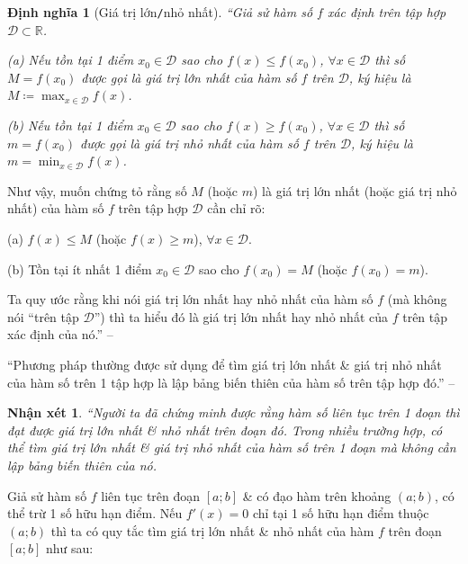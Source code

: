 \documentclass{article}
\numberwithin{equation}{section}
\newtheorem{nhanxet}{Nhận xét}[section]
\newtheorem{dinhnghia}{Định nghĩa}[section]
\begin{document}
\begin{dinhnghia}[Giá trị lớn\texttt{/}nhỏ nhất]
	``Giả sử hàm số $f$ xác định trên tập hợp $\mathcal{D}\subset\mathbb{R}$.
	\begin{enumerate*}
		\item[(a)] Nếu tồn tại 1 điểm $x_0\in\mathcal{D}$ sao cho $f(x)\le f(x_0)$, $\forall x\in\mathcal{D}$ thì số $M = f(x_0)$ được gọi là \emph{giá trị lớn nhất} của hàm số $f$ trên $\mathcal{D}$, ký hiệu là $M\coloneqq\max_{x\in\mathcal{D}} f(x)$.
		\item[(b)] Nếu tồn tại 1 điểm $x_0\in\mathcal{D}$ sao cho $f(x)\ge f(x_0)$, $\forall x\in\mathcal{D}$ thì số $m = f(x_0)$ được gọi là \emph{giá trị nhỏ nhất} của hàm số $f$ trên $\mathcal{D}$, ký hiệu là $m = \min_{x\in\mathcal{D}} f(x)$.
	\end{enumerate*}
\end{dinhnghia}
Như vậy, muốn chứng tỏ rằng số $M$ (hoặc $m$) là giá trị lớn nhất (hoặc giá trị nhỏ nhất) của hàm số $f$ trên tập hợp $\mathcal{D}$ cần chỉ rõ:
\begin{enumerate*}
	\item[(a)] $f(x)\le M$ (hoặc $f(x)\ge m$), $\forall x\in\mathcal{D}$.
	\item[(b)] Tồn tại ít nhất 1 điểm $x_0\in\mathcal{D}$ sao cho $f(x_0) = M$ (hoặc $f(x_0) = m$).
\end{enumerate*}
Ta quy ước rằng khi nói giá trị lớn nhất hay nhỏ nhất của hàm số $f$ (mà không nói ``trên tập $\mathcal{D}$'') thì ta hiểu đó là giá trị lớn nhất hay nhỏ nhất của $f$ trên tập xác định của nó.'' -- \cite[p. 18]{SGK_Toan_12_giai_tich_nang_cao}

``Phương pháp thường được sử dụng để tìm giá trị lớn nhất \& giá trị nhỏ nhất của hàm số trên 1 tập hợp là lập bảng biến thiên của hàm số trên tập hợp đó.'' -- \cite[p. 19]{SGK_Toan_12_giai_tich_nang_cao}

\begin{nhanxet}
	``Người ta đã chứng minh được rằng hàm số liên tục trên 1 đoạn thì đạt được giá trị lớn nhất \& nhỏ nhất trên đoạn đó. Trong nhiều trường hợp, có thể tìm giá trị lớn nhất \& giá trị nhỏ nhất của hàm số trên 1 đoạn mà không cần lập bảng biến thiên của nó.
\end{nhanxet}
Giả sử hàm số $f$ liên tục trên đoạn $[a;b]$ \& có đạo hàm trên khoảng $(a;b)$, có thể trừ 1 số hữu hạn điểm. Nếu $f'(x) = 0$ chỉ tại 1 số hữu hạn điểm thuộc $(a;b)$ thì ta có quy tắc tìm giá trị lớn nhất \& nhỏ nhất của hàm $f$ trên đoạn $[a;b]$ như sau:
\end{document}
